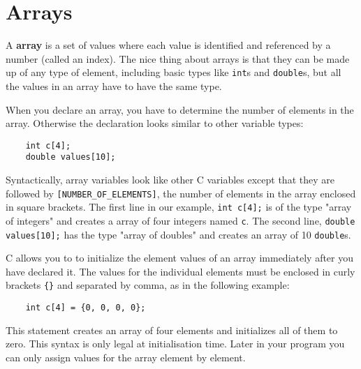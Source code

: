 
\chapter{Arrays}
\label{arrays}

A {\bf array} is a set of values where each value is identified and referenced by a
number (called an index).  The nice thing
about arrays is that they can be made up of any type of element,
including basic types like {\tt int}s and {\tt double}s, 
but all the values in an array have to have the same type.


When you declare an array, you have to determine the number of
elements in the array. Otherwise the declaration looks similar to other variable types:

\begin{verbatim}
    int c[4];
    double values[10];
\end{verbatim}


%

Syntactically, array variables look like other C variables except that they are followed 
by {\tt [NUMBER\_OF\_ELEMENTS]}, the number of elements in the array enclosed in square brackets. 
The first line in our example, {\tt int c[4];} is of the type "array of integers" and creates a array of four integers named {\tt c}.
The second line, {\tt double values[10];} has the type "array of doubles" and
  creates an array of 10 {\tt double}s. 


%

C allows you to to initialize the element values of an array immediately
after you have declared it.  The values  for the individual elements must be 
enclosed in curly brackets {\tt \{\}} and separated by comma, as in the following example:

\begin{verbatim}
    int c[4] = {0, 0, 0, 0};
\end{verbatim}

This statement creates an array of four elements and initializes
all of them to zero.
This syntax is only legal at initialisation time. Later in your program you can only
assign values for the array element by element.

